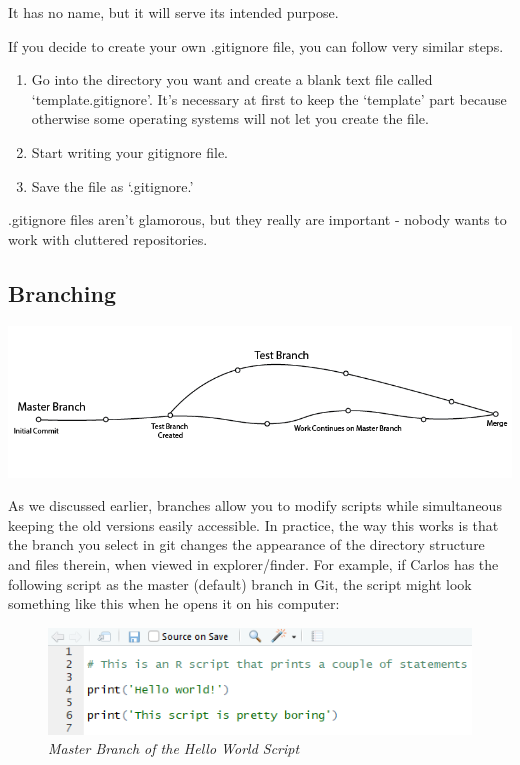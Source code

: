 \documentclass[
]{book}
\begin{document}
It has no name, but it will serve its intended purpose.

If you decide to create your own .gitignore file, you can follow very similar steps.

\begin{enumerate}
\def\labelenumi{\arabic{enumi}.}
\item
  Go into the directory you want and create a blank text file called `template.gitignore'. It's necessary at first to keep the `template' part because otherwise some operating systems will not let you create the file.
\item
  Start writing your gitignore file.
\item
  Save the file as `.gitignore.'
\end{enumerate}

.gitignore files aren't glamorous, but they really are important - nobody wants to work with cluttered repositories.

\hypertarget{branching}{%
\subsection{Branching}\label{branching}}

\includegraphics{images/branchinggraphic.PNG}

As we discussed earlier, branches allow you to modify scripts while simultaneous keeping the old versions easily accessible. In practice, the way this works is that the branch you select in git changes the appearance of the directory structure and files therein, when viewed in explorer/finder. For example, if Carlos has the following script as the master (default) branch in Git, the script might look something like this when he opens it on his computer:

\begin{figure}
\centering
\includegraphics{images/hello1.PNG}
\caption{\emph{Master Branch of the Hello World Script}}
\end{figure}
\end{document}
